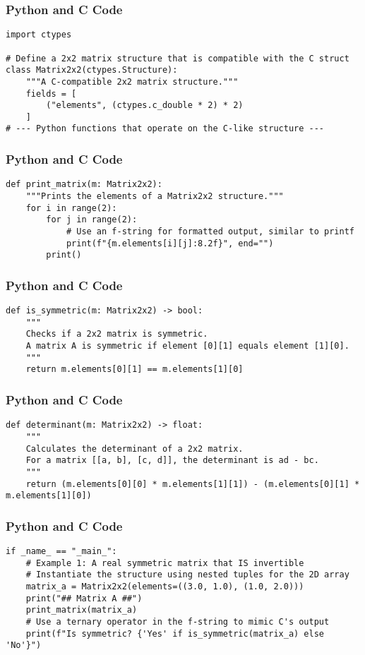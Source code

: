 \documentclass{beamer}
\begin{document}
\begin{frame}[fragile]
\frametitle{Python and C Code}
\begin{lstlisting}
import ctypes

# Define a 2x2 matrix structure that is compatible with the C struct
class Matrix2x2(ctypes.Structure):
    """A C-compatible 2x2 matrix structure."""
    fields = [
        ("elements", (ctypes.c_double * 2) * 2)
    ]
# --- Python functions that operate on the C-like structure ---
\end{lstlisting}
\end{frame}

\begin{frame}[fragile]
\frametitle{Python and C Code}
\begin{lstlisting}
def print_matrix(m: Matrix2x2):
    """Prints the elements of a Matrix2x2 structure."""
    for i in range(2):
        for j in range(2):
            # Use an f-string for formatted output, similar to printf
            print(f"{m.elements[i][j]:8.2f}", end="")
        print()
\end{lstlisting}
\end{frame}

\begin{frame}[fragile]
\frametitle{Python and C Code}
\begin{lstlisting}
def is_symmetric(m: Matrix2x2) -> bool:
    """
    Checks if a 2x2 matrix is symmetric.
    A matrix A is symmetric if element [0][1] equals element [1][0].
    """
    return m.elements[0][1] == m.elements[1][0]
\end{lstlisting}
\end{frame}

\begin{frame}[fragile]
\frametitle{Python and C Code}
\begin{lstlisting}
def determinant(m: Matrix2x2) -> float:
    """
    Calculates the determinant of a 2x2 matrix.
    For a matrix [[a, b], [c, d]], the determinant is ad - bc.
    """
    return (m.elements[0][0] * m.elements[1][1]) - (m.elements[0][1] * m.elements[1][0])
\end{lstlisting}
\end{frame}

\begin{frame}[fragile]
\frametitle{Python and C Code}
\begin{lstlisting}
if _name_ == "_main_":
    # Example 1: A real symmetric matrix that IS invertible
    # Instantiate the structure using nested tuples for the 2D array
    matrix_a = Matrix2x2(elements=((3.0, 1.0), (1.0, 2.0)))
    print("## Matrix A ##")
    print_matrix(matrix_a)
    # Use a ternary operator in the f-string to mimic C's output
    print(f"Is symmetric? {'Yes' if is_symmetric(matrix_a) else 'No'}")
\end{lstlisting}
\end{frame}
\end{document}
